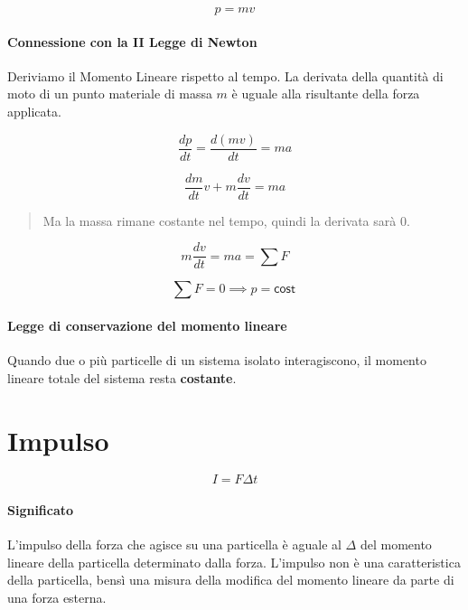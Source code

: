         \begin{equation}
            p = mv
        \end{equation}

        \paragraph{Connessione con la II Legge di Newton} Deriviamo il 
        Momento Lineare rispetto al tempo. La derivata della quantità di moto di
        un punto materiale di massa $m$ è uguale alla risultante della forza 
        applicata.

        \begin{equation*}
            \frac{dp}{dt} = \frac{d(mv)}{dt} = ma
        \end{equation*}

        \begin{equation*}
            \frac{dm}{dt} v + m \frac{dv}{dt} = ma
        \end{equation*}

        \begin{quote}
            Ma la massa rimane costante nel tempo, quindi la derivata sarà 0.
        \end{quote}

        \begin{equation*}
            m\frac{dv}{dt} = ma = \sum F
        \end{equation*}

        \begin{equation*}
            \sum F = 0 \implies p = \textsf{cost}\
        \end{equation*}

        \paragraph{Legge di conservazione del momento lineare} Quando due o più
        particelle di un sistema isolato interagiscono, il momento lineare 
        totale del sistema resta \textbf{costante}.


    \section{Impulso}

        \begin{equation}
            I = F \Delta t
        \end{equation}

        \paragraph{Significato} L'impulso della forza che agisce su una 
        particella è aguale al $\Delta$ del momento lineare della particella 
        determinato dalla forza. L'impulso non è una caratteristica della 
        particella, bensì una misura della modifica del momento lineare da parte
         di una forza esterna.

